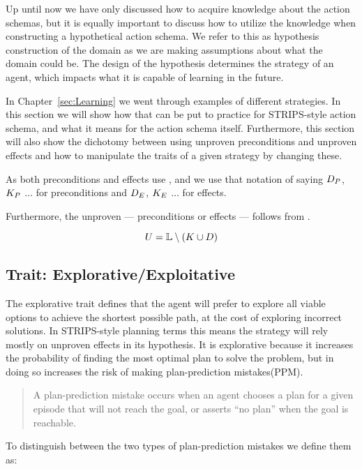 \documentclass[\master/Master.tex]{subfiles}
\begin{document}
	Up until now we have only discussed how to acquire knowledge about the action schemas, but it is equally important to discuss how to utilize the knowledge when constructing a hypothetical action schema.
	We refer to this as hypothesis construction of the domain as we are making assumptions about what the domain could be.
	The design of the hypothesis determines the strategy of an agent, which impacts what it is capable of learning in the future.

	In Chapter~\ref{sec:Learning} we went through examples of different strategies. In this section we will show how that can be put to practice for STRIPS-style action schema, and what it means for the action schema itself.
	Furthermore, this section will also show the dichotomy between using unproven preconditions and unproven effects and how to manipulate the traits of a given strategy by changing these.

	As both preconditions and effects use \Pro, \Dsp and \Up we use that notation of saying $D_P$, $K_P$ $\dots$ for preconditions and
	$D_E$, $K_E$ $\dots$ for effects.
	
	Furthermore, the unproven \Up --- preconditions or effects --- follows from .
	
	\begin{equation}
		 U = \mathbb{L} \setminus (K \cup D)
	\end{equation}

\subsection*{Trait: Explorative/Exploitative}

	The explorative trait defines that the agent will prefer to explore all viable options to achieve the shortest possible path, at the cost of exploring incorrect solutions.
	In STRIPS-style planning terms this means the strategy will rely mostly on unproven effects in its hypothesis.
	It is explorative because it increases the probability of finding the most optimal plan to solve the problem,
	but in doing so increases the risk of making plan-prediction mistakes(PPM).
	\begin{quotation}
				A plan-prediction mistake occurs when an
				agent chooses a plan for a given episode that will not reach
				the goal, or asserts “no plan” when the goal is reachable. \cite{Walsh2008}
	\end{quotation}
	To distinguish between the two types of plan-prediction mistakes we define them as:
\end{document}
